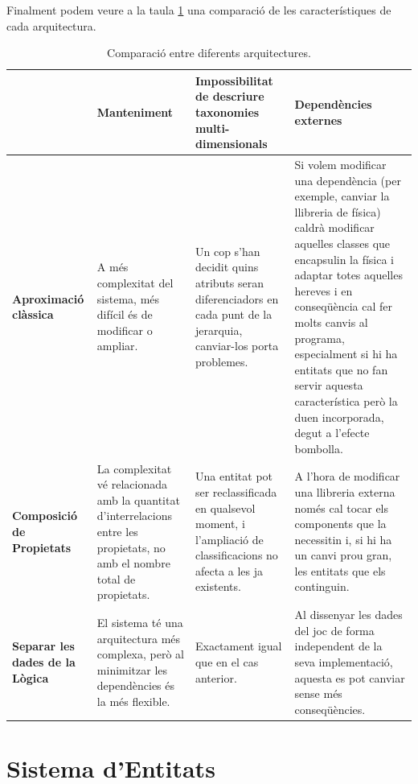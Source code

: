 Finalment podem veure a la taula \ref{tab:comparacioFilosofies} una comparació de les característiques de cada arquitectura.

\begin{table}
  \begin{tabular}{ | p{} | p{} | p{} | p{} | }
    \hline
     &
     {\bf Manteniment} &
     {\bf Impossibilitat de descriure taxonomies multi-dimensionals} &
     {\bf Dependències externes} \\
     \hline
     
     {\bf Aproximació clàssica} &
     A més complexitat del sistema, més difícil és de modificar o ampliar. &
     Un cop s'han decidit quins atributs seran diferenciadors en cada punt de la jerarquia, canviar-los porta problemes. &
     Si volem modificar una dependència (per exemple, canviar la llibreria de física) caldrà modificar aquelles classes que encapsulin la física i adaptar totes aquelles hereves i en conseqüència cal fer molts canvis al programa, especialment si hi ha entitats que no fan servir aquesta característica però la duen incorporada, degut a l'efecte bombolla.\\
     \hline
     
     {\bf Composició de Propietats} &
     La complexitat vé relacionada amb la quantitat d'interrelacions entre les propietats, no amb el nombre total de propietats. &
     Una entitat pot ser reclassificada en qualsevol moment, i l'ampliació de classificacions no afecta a les ja existents. &
     A l'hora de modificar una llibreria externa només cal tocar els components que la necessitin i, si hi ha un canvi prou gran, les entitats que els continguin. \\
     \hline
     
     {\bf Separar les dades de la Lògica} &
     El sistema té una arquitectura més complexa, però al minimitzar les dependències és la més flexible. &
     Exactament igual que en el cas anterior. &
     Al dissenyar les dades del joc de forma independent de la seva implementació, aquesta es pot canviar sense més conseqüències. \\
     \hline
  \end{tabular}
  \caption{Comparació entre diferents arquitectures. \label{tab:comparacioFilosofies}}
\end{table}

\section{Sistema d'Entitats}

